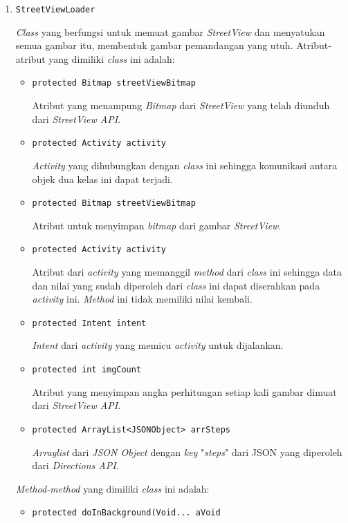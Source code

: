\begin{enumerate}
	\item \texttt{StreetViewLoader}
	
	\textit{Class} yang berfungsi untuk memuat gambar \textit{StreetView} dan menyatukan semua gambar itu, membentuk gambar pemandangan yang utuh. Atribut-atribut yang dimiliki \textit{class} ini adalah:
	
	\begin{itemize}
		\item \texttt{protected Bitmap streetViewBitmap}
		
		Atribut yang menampung \textit{Bitmap} dari \textit{StreetView} yang telah diunduh dari \textit{StreetView API}.	
		\item \texttt{protected Activity activity}
		
		\textit{Activity} yang dihubungkan dengan \textit{class} ini  sehingga komunikasi antara objek dua kelas ini dapat terjadi.
		
		\item \texttt{protected Bitmap streetViewBitmap}
		
		Atribut untuk menyimpan \textit{bitmap} dari gambar \textit{StreetView}.
		\item \texttt{protected Activity activity}
		
		Atribut dari \textit{activity} yang memanggil \textit{method} dari \textit{class} ini sehingga data dan nilai yang sudah diperoleh dari \textit{class} ini dapat diserahkan pada \textit{activity} ini. \textit{Method} ini tidak memiliki nilai kembali.
		\item \texttt{protected Intent intent}  
		
		\textit{Intent} dari \textit{activity} yang memicu \textit{activity} untuk dijalankan.
		\item \texttt{protected int imgCount}
		
		Atribut yang menyimpan angka perhitungan setiap kali gambar dimuat dari \textit{StreetView API}.
		\item \texttt{protected ArrayList<JSONObject> arrSteps}
		
		\textit{Arraylist} dari \textit{JSON Object} dengan \textit{key} "\textit{steps}" dari JSON yang diperoleh dari \textit{Directions API}.
	\end{itemize}
	
	\textit{Method-method} yang dimiliki \textit{class} ini adalah:
	
	\begin{itemize}
		\item \texttt{protected doInBackground(Void... aVoid}
		

\end{itemize}
\end{enumerate}
